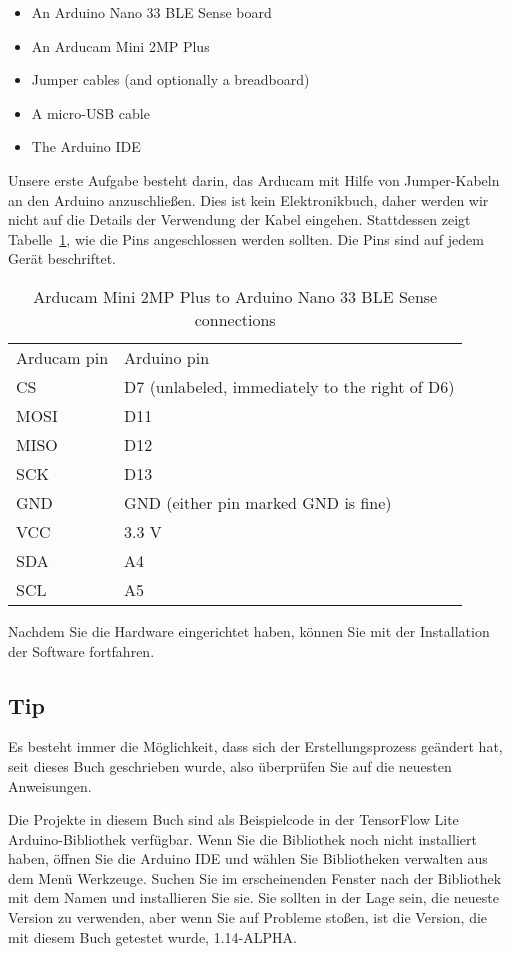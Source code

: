 \begin{itemize}
  \item An Arduino Nano 33 BLE Sense board
  \item An Arducam Mini 2MP Plus
  \item Jumper cables (and optionally a breadboard)
  \item A micro-USB cable
  \item The Arduino IDE
\end{itemize}

Unsere erste Aufgabe besteht darin, das Arducam mit Hilfe von Jumper-Kabeln an den Arduino anzuschließen. Dies ist kein Elektronikbuch, daher werden wir nicht auf die Details der Verwendung der Kabel eingehen. Stattdessen zeigt Tabelle~\ref{ArducamPins}, wie die Pins angeschlossen werden sollten. Die Pins sind auf jedem Gerät beschriftet.

\begin{table}
  \centering
  
  \begin{tabular}{ll}    
    Arducam pin & Arduino pin \\
    CS   & D7 (unlabeled, immediately to the right of D6) \\
    MOSI & D11 \\
    MISO & D12 \\
    SCK  & D13 \\
    GND  & GND (either pin marked GND is fine) \\
    VCC  & 3.3 V \\
    SDA  & A4 \\
    SCL  & A5 \\
\end{tabular}
  \caption{ Arducam Mini 2MP Plus to Arduino Nano 33 BLE Sense connections}\label{ArducamPins}
  
\end{table}

Nachdem Sie die Hardware eingerichtet haben, können Sie mit der Installation der Software fortfahren.

\subsection{Tip}

Es besteht immer die Möglichkeit, dass sich der Erstellungsprozess geändert hat, seit dieses Buch geschrieben wurde, also überprüfen Sie  auf die neuesten Anweisungen.

Die Projekte in diesem Buch sind als Beispielcode in der TensorFlow Lite Arduino-Bibliothek verfügbar. Wenn Sie die Bibliothek noch nicht installiert haben, öffnen Sie die Arduino IDE und wählen Sie Bibliotheken verwalten aus dem Menü Werkzeuge. Suchen Sie im erscheinenden Fenster nach der Bibliothek mit dem Namen  und installieren Sie sie. Sie sollten in der Lage sein, die neueste Version zu verwenden, aber wenn Sie auf Probleme stoßen, ist die Version, die mit diesem Buch getestet wurde, 1.14-ALPHA.

